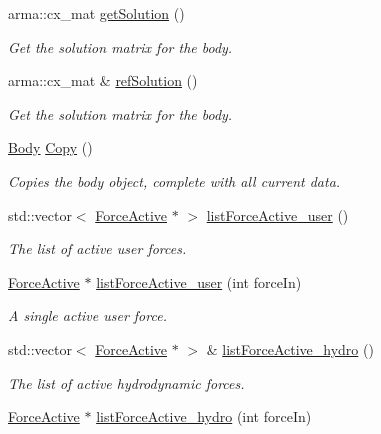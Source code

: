 \begin{DoxyCompactItemize}
arma\-::cx\-\_\-mat \hyperlink{classosea_1_1ofreq_1_1_body_a5153b4cfad5bf12ae6f279a5e7190c31}{get\-Solution} ()
\begin{DoxyCompactList}\small\item\em Get the solution matrix for the body. \end{DoxyCompactList}\item 
arma\-::cx\-\_\-mat \& \hyperlink{classosea_1_1ofreq_1_1_body_ae799af5531c35381830061f6abc0bb17}{ref\-Solution} ()
\begin{DoxyCompactList}\small\item\em Get the solution matrix for the body. \end{DoxyCompactList}\item 
\hyperlink{classosea_1_1ofreq_1_1_body}{Body} \hyperlink{classosea_1_1ofreq_1_1_body_a370dc9a5702d93d9295a9618ebdef456}{Copy} ()
\begin{DoxyCompactList}\small\item\em Copies the body object, complete with all current data. \end{DoxyCompactList}\item 
std\-::vector$<$ \hyperlink{classosea_1_1ofreq_1_1_force_active}{Force\-Active} $\ast$ $>$ \hyperlink{classosea_1_1ofreq_1_1_body_acc646c06517d67b4d8dba821b5f87d8e}{list\-Force\-Active\-\_\-user} ()
\begin{DoxyCompactList}\small\item\em The list of active user forces. \end{DoxyCompactList}\item 
\hyperlink{classosea_1_1ofreq_1_1_force_active}{Force\-Active} $\ast$ \hyperlink{classosea_1_1ofreq_1_1_body_ad55994a87e95520959a2d236e02168ea}{list\-Force\-Active\-\_\-user} (int force\-In)
\begin{DoxyCompactList}\small\item\em A single active user force. \end{DoxyCompactList}\item 
std\-::vector$<$ \hyperlink{classosea_1_1ofreq_1_1_force_active}{Force\-Active} $\ast$ $>$ \& \hyperlink{classosea_1_1ofreq_1_1_body_a2169495533eebe0f4f05d9e2cb71f42b}{list\-Force\-Active\-\_\-hydro} ()
\begin{DoxyCompactList}\small\item\em The list of active hydrodynamic forces. \end{DoxyCompactList}\item 
\hyperlink{classosea_1_1ofreq_1_1_force_active}{Force\-Active} $\ast$ \hyperlink{classosea_1_1ofreq_1_1_body_aa83129940f0eb3a27686b35292bf3339}{list\-Force\-Active\-\_\-hydro} (int force\-In)

\end{DoxyCompactItemize}
